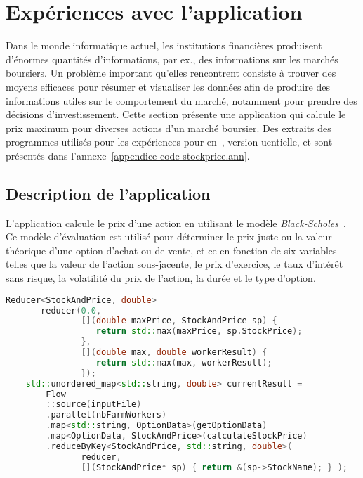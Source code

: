 \section{Expériences avec l'application }
\label{stockprice.sect}

Dans le monde informatique actuel, les institutions financi\`eres produisent d'\'enormes quantit\'es d'informations, par ex., des informations sur les march\'es boursiers. Un probl\`eme important qu'elles rencontrent consiste \`a trouver des moyens efficaces pour r\'esumer et visualiser les donn\'ees afin de produire des informations utiles sur le comportement du march\'e, notamment pour prendre des d\'ecisions d'investissement. Cette section pr\'esente une application qui calcule le prix maximum pour diverses actions d'un marché boursier. Des extraits des programmes utilis\'es pour les exp\'eriences pour  en~,  version uentielle,  et  sont pr\'esent\'es dans l'annexe~\ref{appendice-code-stockprice.ann}.


\subsection{Description de l'application}

L'application  calcule le prix d'une action en utilisant le modèle \emph{Black-Scholes}~\citep{macbeth1979empirical}. Ce mod\`ele d'\'evaluation est utilis\'e pour d\'eterminer le prix juste ou la valeur th\'eorique d'une option d'achat ou de vente, et ce en fonction de six variables telles que la valeur de l'action sous-jacente, le prix d'exercice, le taux d'int\'er\^et sans risque, la volatilit\'e du prix de l'action, la dur\'ee et le type d'option. 

\begin{lstlisting}[float,label={StockPrice-code.listing},gobble=4,basicstyle=\ttfamily\footnotesize,language=c++,caption={Un extrait du code de \TT{StockPrice.cpp} (version \ppff).},frame=single]
    Reducer<StockAndPrice, double>
       reducer(0.0, 
               [](double maxPrice, StockAndPrice sp) {
                  return std::max(maxPrice, sp.StockPrice);
               },
               [](double max, double workerResult) { 
                  return std::max(max, workerResult);
               });
    std::unordered_map<std::string, double> currentResult =
        Flow
        ::source(inputFile)
        .parallel(nbFarmWorkers)
        .map<std::string, OptionData>(getOptionData)
        .map<OptionData, StockAndPrice>(calculateStockPrice)
        .reduceByKey<StockAndPrice, std::string, double>(
               reducer, 
               [](StockAndPrice* sp) { return &(sp->StockName); } );
\end{lstlisting}


